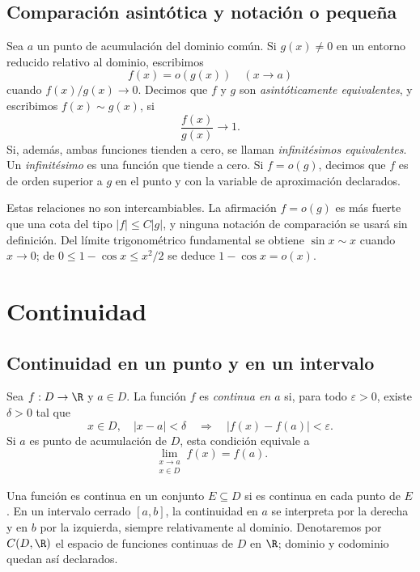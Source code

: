 \subsection{Comparación asintótica y notación o pequeña}

Sea \(a\) un punto de acumulación del dominio común. Si \(g(x)\ne0\) en un
entorno reducido relativo al dominio, escribimos
\[
  f(x)=o(g(x)) \quad(x\to a)
\]
cuando \(f(x)/g(x)\to0\). Decimos que \(f\) y \(g\) son
\emph{asintóticamente equivalentes}, y escribimos \(f(x)\sim g(x)\), si
\[
  \frac{f(x)}{g(x)}\longrightarrow1.
\]
Si, además, ambas funciones tienden a cero, se llaman
\emph{infinitésimos equivalentes}. Un \emph{infinitésimo} es una función que
tiende a cero. Si
\(f=o(g)\), decimos que \(f\) es de orden superior a \(g\) en el punto y con
la variable de aproximación declarados.

Estas relaciones no son intercambiables. La afirmación \(f=o(g)\) es más
fuerte que una cota del tipo \(|f|\le C|g|\), y ninguna notación de comparación
se usará sin definición. Del límite trigonométrico fundamental se obtiene
\(\sin x\sim x\) cuando \(x\to0\); de
\(0\le1-\cos x\le x^2/2\) se deduce
\(1-\cos x=o(x)\).

\section{Continuidad}
\label{sec:continuidad}

\subsection{Continuidad en un punto y en un intervalo}

\begin{definicion}
Sea \(f:D\to\R\) y \(a\in D\). La función \(f\) es \emph{continua en
\(a\)} si, para todo \(\varepsilon>0\), existe \(\delta>0\) tal que
\[
 x\in D,\quad |x-a|<\delta
 \quad\Longrightarrow\quad |f(x)-f(a)|<\varepsilon.
\]
Si \(a\) es punto de acumulación de \(D\), esta condición equivale a
\[
  \lim_{\substack{x\to a\\x\in D}}f(x)=f(a).
\]
\end{definicion}

Una función es continua en un conjunto \(E\subseteq D\) si es continua en
cada punto de \(E\). En un intervalo cerrado \([a,b]\), la continuidad en
\(a\) se interpreta por la derecha y en \(b\) por la izquierda, siempre
relativamente al dominio. Denotaremos por \(C(D,\R)\) el espacio de funciones
continuas de \(D\) en \(\R\); dominio y codominio quedan así declarados.

